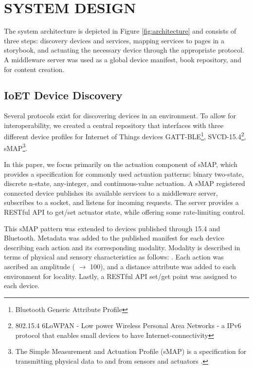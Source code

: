 \documentclass{sigchi}
\newcommand*{\quoted}[1]{{\small{\fontfamily{cmss}\selectfont{#1}}}}
\begin{document}


\section{SYSTEM DESIGN}
The system architecture is depicted in Figure \ref{fig:architecture} and consists of three steps: discovery devices and services, mapping services to pages in a storybook, and actuating the necessary device through the appropriate protocol. 
A middleware server was used as a global device manifest, book repository, and for content creation. 



\subsection{IoET Device Discovery} 
Several protocols exist for discovering devices in an environment. To allow for interoperability, we created a central repository that interfaces with three different device profiles for Internet of Things devices GATT-BLE\footnote{Bluetooth Generic Attribute Profile}, SVCD-15.4\footnote{802.15.4 6LoWPAN - Low power Wireless Personal Area Networks - a IPv6 protocol that enables small devices to have Internet-connectivity}, sMAP\footnote{The Simple Measurement and Actuation Profile (sMAP) is a specification for transmitting physical data to and from sensors and actuators \cite{dawson-haggerty_smap:_2010}.}.

In this paper, we focus primarily on the actuation component of sMAP, which provides a specification for commonly used actuation patterns: binary two-state, discrete n-state, any-integer, and continuous-value actuation. A sMAP registered connected device publishes its available services to a middleware server, subscribes to a socket, and listens for incoming requests. The server provides a RESTful API to get/set actuator state, while offering some rate-limiting control. 

This sMAP pattern was extended to devices published through 15.4 and Bluetooth. 
Metadata was added to the published manifest for each device describing each action and its corresponding modality. 
Modality is described in terms of physical and sensory characteristics as follows: \quoted{$\langle$ light, air, sound, smell, heat, taste, motion $\rangle$}.
Each action was ascribed an amplitude (\quoted{on} $\rightarrow$ 100), and a distance attribute was added to each environment for locality. Lastly, a RESTful API set/get point was assigned to each device.
\end{document}
